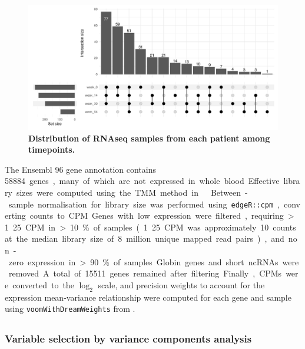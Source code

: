 \begin{figure}
    \centering
    \includegraphics[width=1.0\textwidth,page=1]{mainmatter/figures/chapter_04/process_pheno.pheno_filtered_dge.Visit_Label_upset.pdf}
    \caption{
        \textbf{Distribution of \gls{RNAseq} samples from each patient among timepoints.}
    }
    \label{fig:multipants_visits_upset}
\end{figure}

The Ensembl 96 gene annotation contains \SI{58884} genes, many of which are not expressed in whole blood.
Effective library sizes were computed using the \gls{TMM} method in  \autocite{robinson2010EdgeRBioconductorPackage}.
Between-sample normalisation for library size was performed using \texttt{edgeR::cpm}, converting counts to \gls{CPM}.
Genes with low expression were filtered,
requiring >1.25 CPM in >10\% of samples (1.25 \gls{CPM} was approximately 10 counts at the median library size of 8 million unique mapped read pairs),
and non-zero expression in >90\% of samples.
Globin genes and short \glspl{ncRNA} were removed.
A total of \num{15511} genes remained after filtering.
Finally, \glspl{CPM} were converted to the $\log_{2}$ scale, and precision weights to account for the expression mean-variance relationship were computed for each gene and sample using \texttt{voomWithDreamWeights} from  \autocite{hoffman2016VariancePartitionInterpretingDrivers}.

\subsection{}

\subsubsection{Variable selection by variance components analysis}
\label{subsubsec:multiPANTS_var_selection}

